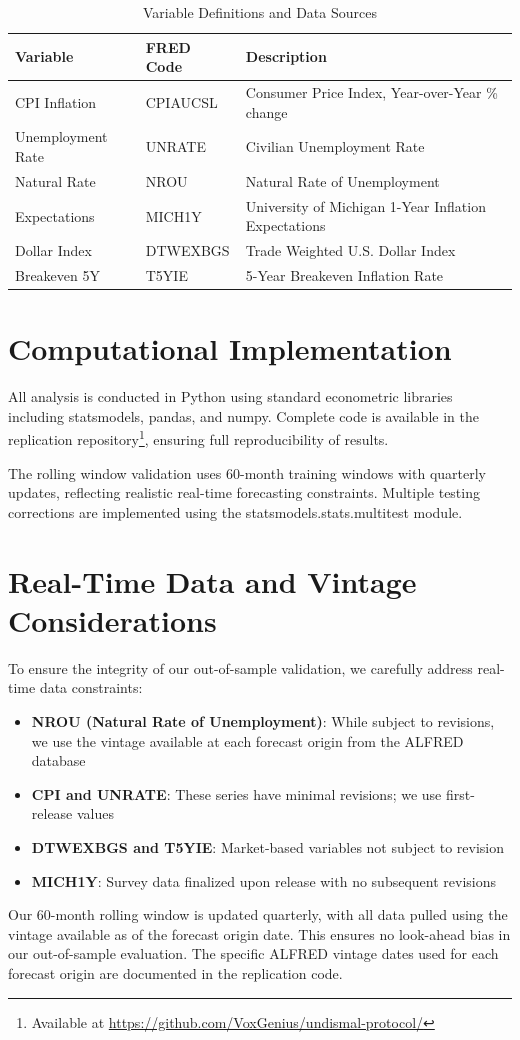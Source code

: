 \documentclass[12pt]{article}
\begin{document}
\begin{table}[H]
\centering
\caption{Variable Definitions and Data Sources}
\label{tab:variables}
\begin{tabular}{lll}
\toprule
Variable & FRED Code & Description \\
\midrule
CPI Inflation & CPIAUCSL & Consumer Price Index, Year-over-Year \% change \\
Unemployment Rate & UNRATE & Civilian Unemployment Rate \\
Natural Rate & NROU & Natural Rate of Unemployment \\
Expectations & MICH1Y & University of Michigan 1-Year Inflation Expectations \\
Dollar Index & DTWEXBGS & Trade Weighted U.S. Dollar Index \\
Breakeven 5Y & T5YIE & 5-Year Breakeven Inflation Rate \\
\bottomrule
\end{tabular}
\end{table}

\section{Computational Implementation}

All analysis is conducted in Python using standard econometric libraries including statsmodels, pandas, and numpy. Complete code is available in the replication repository\footnote{Available at \url{https://github.com/VoxGenius/undismal-protocol/}}, ensuring full reproducibility of results.

The rolling window validation uses 60-month training windows with quarterly updates, reflecting realistic real-time forecasting constraints. Multiple testing corrections are implemented using the statsmodels.stats.multitest module.

\section{Real-Time Data and Vintage Considerations}

To ensure the integrity of our out-of-sample validation, we carefully address real-time data constraints:

\begin{itemize}
\item \textbf{NROU (Natural Rate of Unemployment)}: While subject to revisions, we use the vintage available at each forecast origin from the ALFRED database
\item \textbf{CPI and UNRATE}: These series have minimal revisions; we use first-release values
\item \textbf{DTWEXBGS and T5YIE}: Market-based variables not subject to revision
\item \textbf{MICH1Y}: Survey data finalized upon release with no subsequent revisions
\end{itemize}

Our 60-month rolling window is updated quarterly, with all data pulled using the vintage available as of the forecast origin date. This ensures no look-ahead bias in our out-of-sample evaluation. The specific ALFRED vintage dates used for each forecast origin are documented in the replication code.
\end{document}
